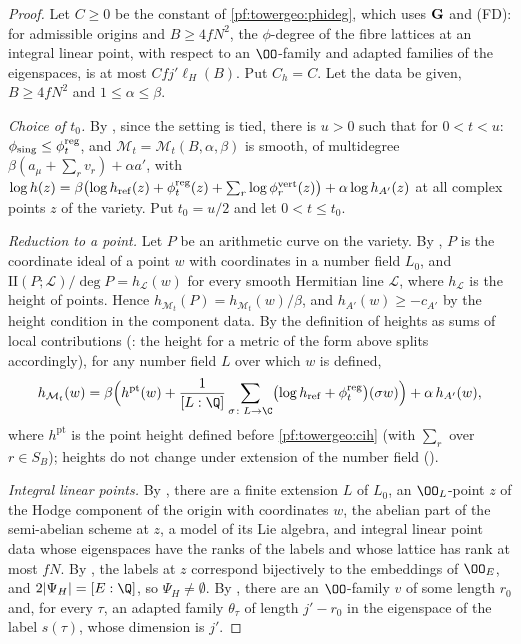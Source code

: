 \begin{proof}
Let $C\ge0$ be the constant of \cref{pf:towergeo:phideg}, which uses $\mathbf G$ and (FD): for admissible origins
and $B\ge4fN^2$, the $\phi$-degree of the fibre lattices at an integral linear point, with respect to an
$\OO$-family and adapted families of the eigenspaces, is at most $Cfj'\ell_H(B)$. Put $C_h=C$. Let the data be
given, $B\ge4fN^2$ and $1\le\alpha\le\beta$.

\emph{Choice of $t_0$.} By , since the
setting is tied, there is $u>0$ such that for $0<t<u$: $\phi_{\mathrm{sing}}\le\phi^{\mathrm{reg}}_t$, and
$\mathcal M_t=\mathcal M_t(B,\alpha,\beta)$ is smooth, of multidegree $\beta(a_\mu+\sum_rv_r)+\alpha a'$, with
$\log h(z)=\beta\bigl(\log h_{\mathrm{ref}}(z)+\phi^{\mathrm{reg}}_t(z)+\sum_r\log\phi^{\mathrm{vert}}_r(z)\bigr)+\alpha\log h_{A'}(z)$
at all complex points $z$ of the variety. Put $t_0=u/2$ and let $0<t\le t_0$.

\emph{Reduction to a point.} Let $P$ be an arithmetic curve on the variety. By
, $P$ is the coordinate ideal of a point $w$ with
coordinates in a number field $L_0$, and $\mathrm{II}(P;\mathcal L)/\deg P=h_{\mathcal L}(w)$ for every smooth
Hermitian line $\mathcal L$, where $h_{\mathcal L}$ is the height of points. Hence
$h_{\mathcal M_t}(P)=h_{\mathcal M_t}(w)/\beta$, and $h_{A'}(w)\ge-c_{A'}$ by the height condition in the component
data. By the definition of heights as sums of local contributions
(: the height for a metric of the form
above splits accordingly), for any number field $L$ over which $w$ is defined,
\begin{equation}\label{pf:towergeo:eq-htdec}
h_{\mathcal M_t}(w)=\beta\Bigl(h^{\mathrm{pt}}(w)+\frac1{[L:\Q]}\sum_{\sigma\colon L\to\C}
\bigl(\log h_{\mathrm{ref}}+\towergeoreg_t\bigr)(\sigma w)\Bigr)+\alpha\,h_{A'}(w),
\end{equation}
where $h^{\mathrm{pt}}$ is the point height defined before \cref{pf:towergeo:cih} (with $\sum_r$ over $r\in S_B$);
heights do not change under extension of the number field
().

\emph{Integral linear points.} By , there are a
finite extension $L$ of $L_0$, an $\OO_L$-point $z$ of the Hodge component of the origin with coordinates
$w$, the abelian part of the semi-abelian scheme at $z$, a model of its Lie algebra, and integral linear point
data whose eigenspaces have the ranks of the labels and whose lattice has rank at most $fN$. By
, the labels at $z$ correspond bijectively to the
embeddings of $\OO_E$, and $2|\Psi_H|=[E:\Q]$, so $\Psi_H\ne\emptyset$. By
, there are an $\OO$-family $v$ of some length
$r_0$ and, for every $\tau$, an adapted family $\theta_\tau$ of length $j'-r_0$ in the eigenspace of the label
$s(\tau)$, whose dimension is $j'$.


\end{proof}
